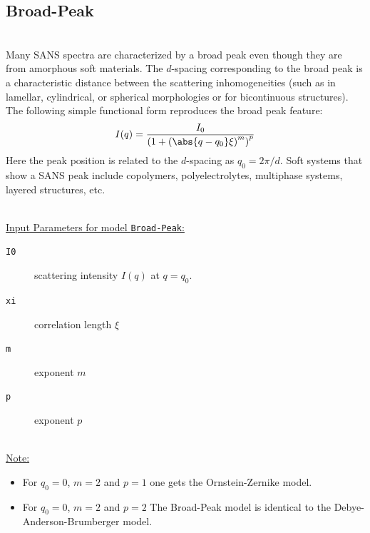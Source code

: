 \subsection{Broad-Peak}
\label{sect:BroadPeak}
 ~\\
Many SANS spectra are characterized by a broad peak even though they
are from amorphous soft materials. The $d$-spacing corresponding to
the broad peak is a characteristic distance between the scattering
inhomogeneities (such as in lamellar, cylindrical, or spherical
morphologies or for bicontinuous structures). The following simple
functional form reproduces the broad peak feature:
\begin{align}
I(q) = \frac{I_0}{\left(1+\left(\abs{q-q_0}\xi\right)^m\right)^p}
\end{align}
Here the peak position is related to the $d$-spacing as $q_0 =
2\pi/d$. Soft systems that show a SANS peak include copolymers,
polyelectrolytes, multiphase systems, layered structures, etc.

\hspace{1pt}\\
\underline{Input Parameters for model \texttt{Broad-Peak}:}\\
\begin{description}
\item[\texttt{I0}] scattering intensity $I(q)$ at $q=q_0$.
\item[\texttt{xi}] correlation length $\xi$
\item[\texttt{m}] exponent $m$
\item[\texttt{p}] exponent $p$
\end{description}

\hspace{1pt}\\
\underline{Note:}
\begin{itemize}
\item For $q_0=0$, $m=2$ and $p=1$ one gets the Ornstein-Zernike model.
\item For $q_0=0$, $m=2$ and $p=2$ The Broad-Peak model is identical to the Debye-Anderson-Brumberger model.
\end{itemize}

